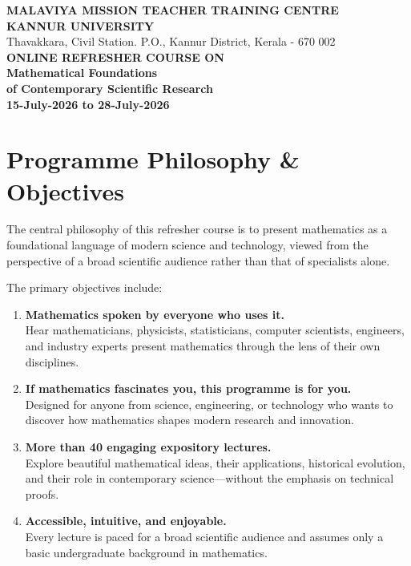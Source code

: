 \documentclass[11pt,a4paper]{article}
\begin{document}
\begin{center}
    {\Large \textbf{\color{primary} MALAVIYA MISSION TEACHER TRAINING CENTRE}}\\[0.3em]
    {\LARGE \textbf{\color{primary} KANNUR UNIVERSITY}}\\[0.3em]
    {\small Thavakkara, Civil Station. P.O., Kannur District, Kerala - 670 002}\\[1.5em]
    
    {\Large \textbf{\color{secondary} ONLINE REFRESHER COURSE ON}}\\[0.5em]
    {\Huge \textbf{\color{primary} Mathematical Foundations}}\\[0.3em]
    {\Large \textbf{\color{primary} of Contemporary Scientific Research}}\\[1em]
    {\large \textbf{15-July-2026 to 28-July-2026}}\\[1.5em]
\end{center}

\section*{Programme Philosophy \& Objectives}
The central philosophy of this refresher course is to present mathematics as a foundational language of modern science and technology, viewed from the perspective of a broad scientific audience rather than that of specialists alone. 

The primary objectives include:
\begin{enumerate}[label=\textbf{\color{secondary}0\arabic*}]
    \item \textbf{Mathematics spoken by everyone who uses it.}\\
    Hear mathematicians, physicists, statisticians, computer scientists, engineers, and industry experts present mathematics through the lens of their own disciplines.
    
    \item \textbf{If mathematics fascinates you, this programme is for you.}\\
    Designed for anyone from science, engineering, or technology who wants to discover how mathematics shapes modern research and innovation.
    
    \item \textbf{More than 40 engaging expository lectures.}\\
    Explore beautiful mathematical ideas, their applications, historical evolution, and their role in contemporary science---without the emphasis on technical proofs.
    
    \item \textbf{Accessible, intuitive, and enjoyable.}\\
    Every lecture is paced for a broad scientific audience and assumes only a basic undergraduate background in mathematics.
\end{enumerate}
\end{document}
